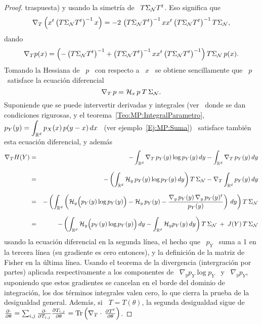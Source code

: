 \begin{proof}
  traspuesta) y usando la simetr\'ia de \ $T \Sigma_{\mathcal{N}} T^t$.  Eso significa
  que
  \[
  \nabla_T \left( x^t \left( T \Sigma_{\mathcal{N}} T^t \right)^{-1} x \right) = - 2 \,
  \left(  T \Sigma_{\mathcal{N}}  T^t \right)^{-1}  x  x^t \left(  T \Sigma_{\mathcal{N}}  T^t
  \right)^{-1} T \Sigma_{\mathcal{N}},
  \]
  dando
  \[
  \nabla_T p(x)  = \left( - \left(  T \Sigma_{\mathcal{N}} T^t \right)^{-1}  + \left( T
      \Sigma_{\mathcal{N}}  T^t   \right)^{-1}  x   x^t  \left(  T   \Sigma_{\mathcal{N}}  T^t
    \right)^{-1} \right) T \Sigma_{\mathcal{N}} \, p(x).
  \]
  Tomando la Hessiana de \ $p$ \  con respecto a \ $x$ \ se obtiene sencillamente
  que \ $p$ \ satisface la ecuaci\'on diferencial
  \[
  \nabla_T \, p = \mathcal{H}_x \, p \: T \, \Sigma_{\mathcal{N}}.
  \]
  Suponiende que  se puede intervertir derivadas  y integrales (ver~\cite{Bar84,
    Bar86}     donde     se      dan     condiciones     rigurosas,     y     el
  teorema~\ref{Teo:MP:IntegralParametro},
  $\displaystyle  p_Y(y)  =  \int_{\mathbb{R}^d}  p_X(x)  \, p(y-x)  \,  dx$  \  (ver
  ejemplo~\ref{Ej:MP:Suma})
  \ satisface tambi\'en esta ecuaci\'on diferencial, y adem\'as
  \begin{eqnarray*}
  \nabla_T H(Y) & = & - \int_{\mathbb{R}^d} \nabla_T \, p_Y(y) \log p_Y(y)
  \, dy - \int_{\mathbb{R}^d} \nabla_T \, p_Y(y) \, dy\\[2.5mm]
  & = & - \left( \int_{\mathbb{R}^d} \mathcal{H}_y \, p_Y(y) \log p_Y(y) \, dy \right) T \,
  \Sigma_{\mathcal{N}} - \nabla_T \int_{\mathbb{R}^d} p_Y(y) \, dy\\[2.5mm]
  & = & - \left( \int_{\mathbb{R}^d} \left( \mathcal{H}_y \Big( p_Y(y) \log p_Y(y) \Big) -
  \mathcal{H}_y \, p_Y(y) - \frac{\nabla_y \, p_Y(y) \, \nabla_y \, p_Y(y)^t}{p_Y(y)}
  \right) \, dy \right) T \, \Sigma_{\mathcal{N}}\\[2.5mm]
  & = & - \left( \int_{\mathbb{R}^d} \mathcal{H}_y \Big( p_Y(y) \log p_Y(y) \Big) \, dy -
  \int_{\mathbb{R}^d} \mathcal{H}_y p_Y(y) \, dy \right) T \, \Sigma_{\mathcal{N}} \: + \: J(Y) \, T
  \, \Sigma_{\mathcal{N}}
  \end{eqnarray*}
  usando la ecuaci\'on diferencial en la segunda l\'inea, el hecho que \ $p_Y$ \
  suma  a  1 en  la  tercera  l\'inea (su  gradiente  es  cero  entonces), y  la
  definici\'on de la matriz de Fisher  en la \'ultima l\'inea. Usando el teorema
  de la  divergencia (intergraci\'on por partes) aplicada  respectivamente a los
  componentes de \ $\nabla_y p_Y \log  p_Y$ \ y \ $\nabla_y p_Y$, suponiendo que
  estos gradientes se cancelan en el borde del dominio de integraci\'on, los dos
  t\'erminos integrales  valen cero, lo que  cierra la prueba  de la desigualdad
  general.  Adem\'as,  si \ $T =  T(\theta)$, la segunda desigualdad  sigue de \
  $\frac{\partial   \cdot}{\partial    \theta}   =   \sum_{i,j}   \frac{\partial
    \cdot}{\partial   T_{i,j}}   \frac{\partial   T_{i,j}}{\partial  \theta}   =
  \operatorname{Tr}\left( \nabla_T \cdot \, \frac{\partial T^t}{\partial \theta} \right)$.
\end{proof}

